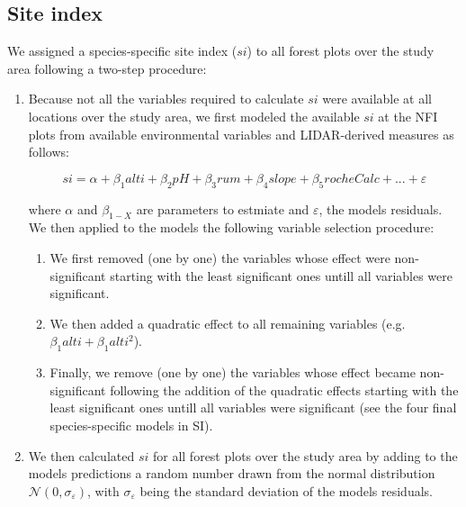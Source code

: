 \documentclass[a4paper]{article}
\begin{document}

\subsection*{Site index}

\noindent We assigned a species-specific site index ($si$) to all forest plots over the study area following a two-step procedure:

\begin{enumerate}
    \item Because not all the variables required to calculate $si$ were available at all locations over the study area, we first modeled the available $si$ at the NFI plots from available environmental variables and LIDAR-derived measures as follows:

    \begin{equation}\label{si}
      si = \alpha + \beta_1 alti + \beta_2 pH +\beta_3 rum +\beta_4 slope +\beta_5 rocheCalc+...+\varepsilon
    \end{equation}

    where $\alpha$ and $\beta_{1-X}$ are parameters to estmiate and $\varepsilon$, the models residuals. We then applied to the models the following variable selection procedure:

    \begin{enumerate}

        \item We first removed (one by one) the variables whose effect were non-significant starting with the least significant ones untill all variables were significant.

        \item We then added a quadratic effect to all remaining variables (e.g. $\beta_1alti + \beta_1alti^2$).

        \item Finally, we remove (one by one) the variables whose effect became non-significant following the addition of the quadratic effects starting with the least significant ones untill all variables were significant (see the four final species-specific models in SI).

  \end{enumerate}

    \item We then calculated $si$ for all forest plots over the study area by adding to the models predictions a random number drawn from the normal distribution $\mathcal{N} (0, \sigma_\varepsilon)$, with $\sigma_\varepsilon$ being the standard deviation of the models residuals.

\end{enumerate}
\end{document}
